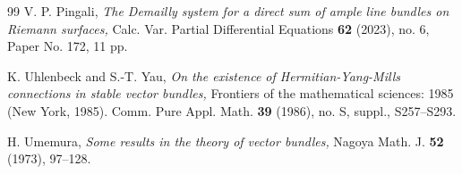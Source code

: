 \documentclass[a4, 12pt, 
]{amsart}
\numberwithin{equation}{section}
\theoremstyle{plain}
\theoremstyle{definition}
\theoremstyle{remark}
\begin{document}
\begin{thebibliography}{99}
 V. P. Pingali, 
 \textit{The Demailly system for a direct sum of ample line bundles on Riemann surfaces,} 
 Calc. Var. Partial Differential Equations \textbf{62} (2023), no. 6, Paper No. 172, 11 pp.

 K. Uhlenbeck and S.-T. Yau, 
 \textit{On the existence of Hermitian-Yang-Mills connections in stable vector bundles,} 
 Frontiers of the mathematical sciences: 1985 (New York, 1985). Comm. Pure Appl. Math. \textbf{39} (1986), no. S, suppl., {\rm S}257--{\rm S}293. 

 H. Umemura, 
 \textit{Some results in the theory of vector bundles,} 
 Nagoya Math. J. \textbf{52} (1973), 97--128. 
  
\end{thebibliography}
\end{document}
